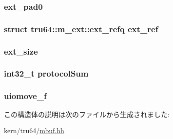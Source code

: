 \label{structtru64_1_1m__ext_a6e5005ddf0a8a3f38e525da542b7cbb3}
\hypertarget{structtru64_1_1m__ext_a087be88aca54d6d893ebec56314e32ed}{
\subsubsection[{ext\_\-pad0}]{ {\bf ext\_\-pad0}}}
\label{structtru64_1_1m__ext_a087be88aca54d6d893ebec56314e32ed}
\hypertarget{structtru64_1_1m__ext_af1925993078a0dc9e8557ca1acec6d0d}{
\subsubsection[{ext\_\-ref}]{\setlength{\rightskip}{0pt plus 5cm}struct {\bf tru64::m\_\-ext::ext\_\-refq}  {\bf ext\_\-ref}}}
\label{structtru64_1_1m__ext_af1925993078a0dc9e8557ca1acec6d0d}
\hypertarget{structtru64_1_1m__ext_a519071384305eb6392efc1e892306389}{
\subsubsection[{ext\_\-size}]{ {\bf ext\_\-size}}}
\label{structtru64_1_1m__ext_a519071384305eb6392efc1e892306389}
\hypertarget{structtru64_1_1m__ext_a04669846c1174fea5ec850923fbab711}{
\subsubsection[{protocolSum}]{\setlength{\rightskip}{0pt plus 5cm}int32\_\-t {\bf protocolSum}}}
\label{structtru64_1_1m__ext_a04669846c1174fea5ec850923fbab711}
\hypertarget{structtru64_1_1m__ext_a4a94b76a1b4e681dbfe7cd62507cfd50}{
\subsubsection[{uiomove\_\-f}]{ {\bf uiomove\_\-f}}}
\label{structtru64_1_1m__ext_a4a94b76a1b4e681dbfe7cd62507cfd50}


この構造体の説明は次のファイルから生成されました:\begin{DoxyCompactItemize}
\item 
kern/tru64/\hyperlink{mbuf_8hh}{mbuf.hh}\end{DoxyCompactItemize}
